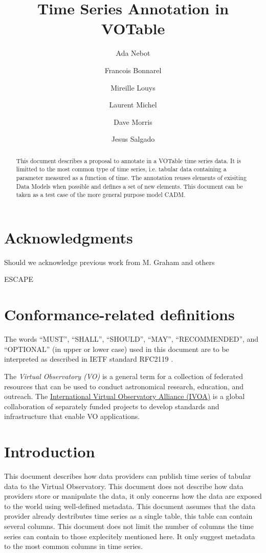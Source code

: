\documentclass[11pt,a4paper]{ivoa}
\title{Time Series Annotation in VOTable}
\author[http://www.ivoa.net/twiki/bin/view/IVOA/AdaNebot]{Ada Nebot}
\author[http://www.ivoa.net/twiki/bin/view/IVOA/FrancoisBonnarel]{Francois Bonnarel}
\author[http://www.ivoa.net/twiki/bin/view/IVOA/MireilleLouys]{Mireille Louys}
\author[http://www.ivoa.net/twiki/bin/view/IVOA/LaurentMichel]{Laurent Michel}
\author[http://www.ivoa.net/twiki/bin/view/IVOA/DaveMorris]{Dave Morris}
\author[http://www.ivoa.net/twiki/bin/view/IVOA/JesusSalgado]{Jesus Salgado}
\begin{document}
\begin{abstract}
  This document describes a proposal to annotate in a VOTable time series data. It is limitted to the most common type of time series, i.e. tabular data containing a parameter measured as a function of time. The annotation reuses elements of exisiting Data Models when possible and defines a set of new elements. This document can be taken as a test case of the more general purpose model CADM. 
\end{abstract}

\section*{Acknowledgments}
Should we acknowledge previous work from M. Graham and others


ESCAPE

\section*{Conformance-related definitions}

The words ``MUST'', ``SHALL'', ``SHOULD'', ``MAY'', ``RECOMMENDED'', and
``OPTIONAL'' (in upper or lower case) used in this document are to be
interpreted as described in IETF standard RFC2119 \citep{std:RFC2119}.

The \emph{Virtual Observatory (VO)} is a
general term for a collection of federated resources that can be used
to conduct astronomical research, education, and outreach.
The \href{http://www.ivoa.net}{International
Virtual Observatory Alliance (IVOA)} is a global
collaboration of separately funded projects to develop standards and
infrastructure that enable VO applications.


\section{Introduction}
This document describes how data providers can publish time series of tabular data to the Virtual Observatory. This document does not describe how data providers store or manipulate the data, it only concerns how the data are exposed to the world using well-defined metadata. This document assumes that the data provider already destributes time series as a single table, this table can contain several columns. This document does not limit the number of columns the time series can contain to those explecitely mentioned here. It only suggest metadata to the most common columns in time series.  
\end{document}
